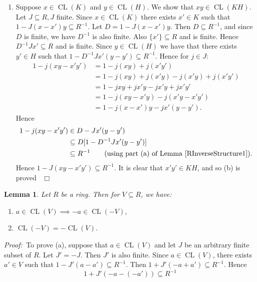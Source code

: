 \documentclass[12pt, oneside]{book}
\newtheorem{lemma}[theorem]{Lemma}
\newcommand{\proof}{{\noindent \it Proof:~}}
\newcommand{\qed}{\hfill ~$\Box$\\}
\def\CL{\operatorname{CL}}
\begin{document}
\begin{enumerate}[label=(\alph*)]
\item Suppose $x \in \CL(K)$ and $y \in \CL(H)$. We show that $x y \in \CL(K H)$. Let $J \subseteq R, J$ finite. Since $x \in \CL(K)$ there exists $x' \in K$ such that $1-J(x-x')y \subseteq R^{-1}$. Let $D=1-J(x-x')y$. Then $D \subseteq R^{-1}$, and since $D$ is finite, 
we have $D^{-1}$ is also finite. Also $\{x' \} \subseteq R$ and is finite. Hence $D^{-1}  J  x' 
\subseteq R$ and is finite. Since $y \in \CL(H)$ we have that there exists $y' \in H$ such that $1- D^{-1} J  x' (y-y') \subseteq R^{-1}$. Hence for $j \in J$:
\begin{align*}
1-j(xy-x'y')
&= 1-j(xy)+j(x'y')\\
&= 1-j(xy)+j(x'y)-j(x'y)+j(x'y')\\
&= 1-jxy + jx'y - jx'y +jx'y'\\
&= 1-j(xy - x'y) - j(x'y - x'y')\\
&= 1-j(x-x')y - j x'(y-y').
\end{align*}
Hence
\begin{align*}
1-j(xy-x'y')
&\in D-J x'(y-y')\\
&\subseteq D[1-D^{-1} J x'(y-y')]\\ 
&\subseteq R^{-1} \qquad \text{(using part (a) of Lemma \ref{RInverseStructure1}).}
\end{align*}
\noindent Hence $1-J(xy-x'y')	\subseteq R^{-1}$. It is clear that $x'y' \in K H$, and so 
(b) is proved \qed

\end{enumerate}


\begin{lemma}  \label{ngtnIsCts}
\normalfont
Let $R$ be a ring. Then for $V \subseteq R$, we have:

\begin{enumerate}[label=(\alph*)]

\item $a \in \CL(V) \implies -a \in \CL(-V)$,

\item $\CL(-V)=-\CL(V)$.

\end{enumerate}

\end{lemma}


\proof \space To prove (a), suppose that $a \in  \CL(V)$ and let $J$ be an arbitrary finite subset of $R$. 
Let $J' =-J$. Then $J'$ is also finite. Since $a \in \CL(V)$, there exists 
$a' \in V$ such that $1-J'(a-a') \subseteq R^{-1}$. Then $1+J'(-a+a') \subseteq R^{-1}$. Hence 
\begin{equation} \label{eqnNgtnIsCts}
1+J'(-a-(-a')) \subseteq R^{-1}
\end{equation}
\end{document}
